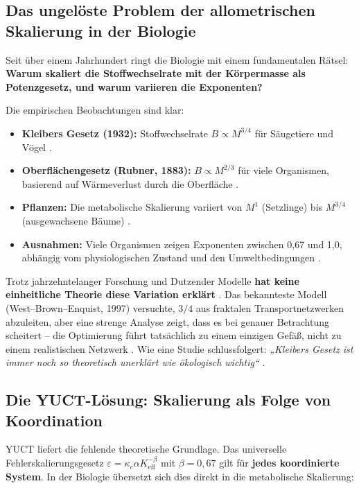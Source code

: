 \documentclass[12pt]{article}
\newcommand{\Keff}{K_{\mathrm{eff}}}
\begin{document}
	\subsection{Das ungelöste Problem der allometrischen Skalierung in der Biologie}
	
	Seit über einem Jahrhundert ringt die Biologie mit einem fundamentalen Rätsel: \textbf{Warum skaliert die Stoffwechselrate mit der Körpermasse als Potenzgesetz, und warum variieren die Exponenten?}
	
	Die empirischen Beobachtungen sind klar:
	\begin{itemize}
		\item \textbf{Kleibers Gesetz (1932):} Stoffwechselrate \(B \propto M^{3/4}\) für Säugetiere und Vögel \cite{Kleiber1932,West1997}.
		\item \textbf{Oberflächengesetz (Rubner, 1883):} \(B \propto M^{2/3}\) für viele Organismen, basierend auf Wärmeverlust durch die Oberfläche \cite{Rubner1883}.
		\item \textbf{Pflanzen:} Die metabolische Skalierung variiert von \(M^{1}\) (Setzlinge) bis \(M^{3/4}\) (ausgewachsene Bäume) \cite{Reich2006}.
		\item \textbf{Ausnahmen:} Viele Organismen zeigen Exponenten zwischen 0,67 und 1,0, abhängig vom physiologischen Zustand und den Umweltbedingungen \cite{Glazier2005}.
	\end{itemize}
	
	Trotz jahrzehntelanger Forschung und Dutzender Modelle \textbf{hat keine einheitliche Theorie diese Variation erklärt} \cite{Agutter2004}. Das bekannteste Modell (West–Brown–Enquist, 1997) versuchte, \(3/4\) aus fraktalen Transportnetzwerken abzuleiten, aber eine strenge Analyse zeigt, dass es bei genauer Betrachtung scheitert – die Optimierung führt tatsächlich zu einem einzigen Gefäß, nicht zu einem realistischen Netzwerk \cite{Dodds2001}. Wie eine Studie schlussfolgert: \textit{„Kleibers Gesetz ist immer noch so theoretisch unerklärt wie ökologisch wichtig“} \cite{Agutter2004}.
	
	\subsection{Die YUCT-Lösung: Skalierung als Folge von Koordination}
	
	YUCT liefert die fehlende theoretische Grundlage. Das universelle Fehlerskalierungsgesetz \(\varepsilon = \kappa_c \alpha \Keff^{-\beta}\) mit \(\beta = 0,67\) gilt für \textbf{jedes koordinierte System}. In der Biologie übersetzt sich dies direkt in die metabolische Skalierung:
	
\end{document}
